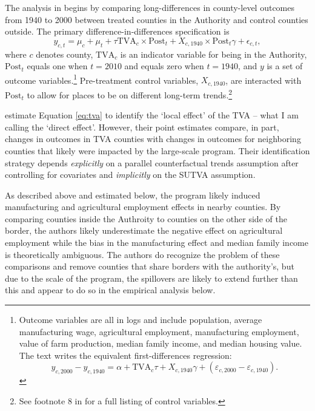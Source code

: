 \documentclass[11pt]{article}
\begin{document}
The analysis in \citet{Kline_Moretti_2014} begins by comparing long-differences in county-level outcomes from 1940 to 2000 between treated counties in the Authority and control counties outside. The primary difference-in-differences specification is
\begin{equation}\label{eq:tva}
    y_{c, t} = \mu_c + \mu_t + \tau \text{TVA}_c \times \text{Post}_t + X_{c, 1940} \times \text{Post}_t \gamma + \epsilon_{c,t},
\end{equation}
where $c$ denotes county, $\text{TVA}_c$ is an indicator variable for being in the Authority, $\text{Post}_t$ equals one when $t = 2010$ and equals zero when $t = 1940$, and $y$ is a set of outcome variables.\footnote{Outcome variables are all in logs and include population, average manufacturing wage, agricultural employment, manufacturing employment, value of farm production, median family income, and median housing value. The text writes the equivalent first-differences regression: \[ 
    y_{c, 2000} - y_{c, 1940} = \alpha + \text{TVA}_c \tau + X_{c, 1940} \gamma + (\varepsilon_{c, 2000} - \varepsilon_{c, 1940}). 
\]} Pre-treatment control variables, $X_{c,1940}$, are interacted with $\text{Post}_t$ to allow for places to be on different long-term trends.\footnote{See footnote 8 in \citet{Kline_Moretti_2014} for a full listing of control variables.} 

\citet{Kline_Moretti_2014} estimate Equation \ref{eq:tva} to identify the `local effect' of the TVA -- what I am calling the `direct effect'. However, their point estimates compare, in part, changes in outcomes in TVA counties with changes in outcomes for neighboring counties that likely were impacted by the large-scale program. Their identification strategy depends \emph{explicitly} on a parallel counterfactual trends assumption after controlling for covariates and \emph{implicitly} on the SUTVA assumption. 

As described above and estimated below, the program likely induced manufacturing and agricultural employment effects in nearby counties. By comparing counties inside the Authroity to counties on the other side of the border, the authors likely underestimate the negative effect on agricultural employment while the bias in the manufacturing effect and median family income is theoretically ambiguous. The authors do recognize the problem of these comparisons and remove counties that share borders with the authority's, but due to the scale of the program, the spillovers are likely to extend further than this and appear to do so in the empirical analysis below.  
\end{document}
